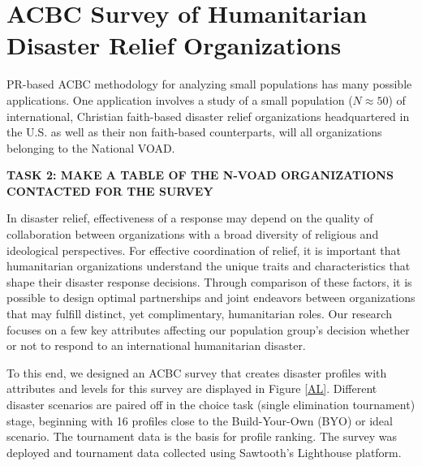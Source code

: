 \documentclass[a4paper, 12pt]{article}
\begin{document}
\section{ACBC Survey of Humanitarian Disaster Relief Organizations}

PR-based ACBC methodology for analyzing small populations has many possible applications. One application involves  a study of a small population ($N\approx 50$) of international, Christian faith-based disaster relief organizations headquartered in the U.S. as well as their non faith-based counterparts, will all organizations belonging to the National VOAD.




{\bf TASK 2: MAKE A TABLE OF THE N-VOAD ORGANIZATIONS CONTACTED FOR THE SURVEY} 

In disaster relief, effectiveness of a response may depend on the quality of collaboration between organizations with a broad diversity of religious and ideological perspectives. For effective coordination of relief, it is important that humanitarian organizations understand the unique traits and characteristics that shape their disaster response decisions. Through comparison of these factors, it is possible to design optimal partnerships and joint endeavors between organizations that may fulfill distinct, yet complimentary, humanitarian roles. Our research focuses on a few key attributes affecting our population group's decision whether or not to respond to an international humanitarian disaster.


To this end, we designed an ACBC survey that creates disaster profiles with attributes and levels for this survey are displayed in Figure \ref{AL}. Different disaster scenarios are paired off  in the choice task (single elimination tournament) stage, beginning with 16 profiles close to the Build-Your-Own (BYO) or ideal scenario. The tournament data is the basis for profile ranking. The survey was deployed and tournament data collected using Sawtooth's Lighthouse platform.
\end{document}
